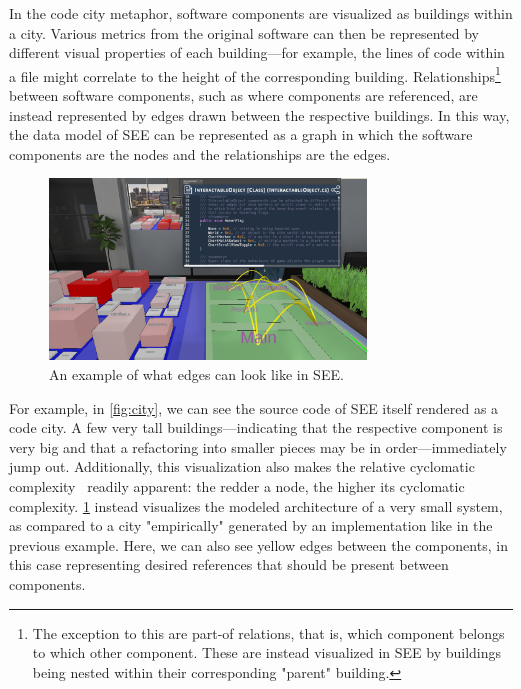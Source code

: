 \documentclass{scrartcl}
\newcommand{\SEE}{\textsc{SEE}}
\begin{document}
In the code city metaphor, software components are visualized as buildings within a city.
Various metrics from the original software can then be represented by different visual properties of each building---for example, the lines of code within a file might correlate to the height of the corresponding building.
Relationships\footnote{
	The exception to this are part-of relations, that is, which component belongs to which other component.
	These are instead visualized in \SEE{} by buildings being nested within their corresponding "parent" building.
} between software components, such as where components are referenced, are instead represented by edges drawn between the respective buildings.
In this way, the data model of \SEE{} can be represented as a graph in which the software components are the nodes and the relationships are the edges.

\begin{figure}
	\begin{center}
		\includegraphics[width=0.75\textwidth,trim={35cm 0 0 20cm},clip]{../figures/SEE_readme}
	\end{center}
	\caption{An example of what edges can look like in \SEE{}.}\label{fig:edges}
\end{figure}


For example, in \cref{fig:city}, we can see the source code of \SEE{} itself rendered as a code city.
A few very tall buildings---indicating that the respective component is very big and that a refactoring into smaller pieces may be in order---immediately jump out.
Additionally, this visualization also makes the relative cyclomatic complexity~\cite{mccabe} readily apparent:
the redder a node, the higher its cyclomatic complexity.
\cref{fig:edges} instead visualizes the modeled architecture of a very small system, as compared to a city "empirically" generated by an implementation like in the previous example.
Here, we can also see yellow edges between the components, in this case representing desired references that should be present between components.
\end{document}
